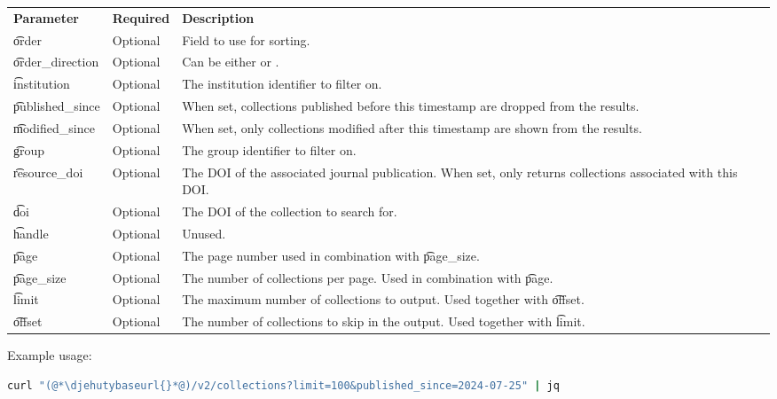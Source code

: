 \begin{tabularx}{\textwidth}{*{2}{!{\VRule[-1pt]}l}!{\VRule[-1pt]}X}
  \headrow
  \textbf{Parameter}   & \textbf{Required} & \textbf{Description}\\
  \t{order}            & Optional & Field to use for sorting.\\
  \t{order\_direction} & Optional & Can be either  or .\\
  \t{institution}      & Optional & The institution identifier to filter on.\\
  \t{published\_since} & Optional & When set, collections published before this
                                    timestamp are dropped from the results.\\
  \t{modified\_since}  & Optional & When set, only collections modified after
                                    this timestamp are shown from the results.\\
  \t{group}            & Optional & The group identifier to filter on.\\
  \t{resource\_doi}    & Optional & The DOI of the associated journal publication.
                                    When set, only returns collections associated
                                    with this DOI.\\
  \t{doi}              & Optional & The DOI of the collection to search for.\\
  \t{handle}           & Optional & Unused.\\
  \t{page}             & Optional & The page number used in combination with
                                    \t{page\_size}.\\
  \t{page\_size}       & Optional & The number of collections per page.  Used
                                    in combination with \t{page}.\\
  \t{limit}            & Optional & The maximum number of collections to output.
                                    Used together with \t{offset}.\\
  \t{offset}           & Optional & The number of collections to skip in the
                                    output.  Used together with \t{limit}.
\end{tabularx}

  Example usage:
\begin{lstlisting}[language=bash]
curl "(@*\djehutybaseurl{}*@)/v2/collections?limit=100&published_since=2024-07-25" | jq
\end{lstlisting}

